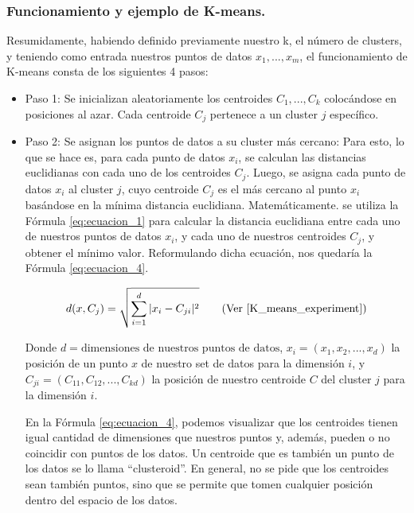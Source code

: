 \documentclass[12pt,a4paper]{article}
\begin{document}
\begin{sloppypar}
\subsubsection{Funcionamiento y ejemplo de K-means.}\label{K_means_funcionamiento}

Resumidamente, habiendo definido previamente nuestro k, el número de clusters, y teniendo como entrada nuestros puntos de datos $x_{1},...,x_{m}$, el funcionamiento de K-means consta de los siguientes 4 pasos\cite{K_means_review}:

\begin{itemize}
\item Paso 1: Se inicializan aleatoriamente los centroides $C_{1},...,C_{k}$ colocándose en posiciones al azar. Cada centroide $C_{j}$ pertenece a un cluster $j$ específico. 
\item Paso 2: Se asignan los puntos de datos a su cluster más cercano: Para esto, lo que se hace es, para cada punto de datos $x_{i}$, se calculan las distancias euclidianas con cada uno de los centroides $C_{j}$. Luego, se asigna cada punto de datos $x_{i}$ al cluster $j$, cuyo centroide $C_{j}$ es el más cercano al punto $x_{i}$ basándose en la mínima distancia euclidiana. Matemáticamente. se utiliza la Fórmula \ref{eq:ecuacion_1} para calcular la distancia euclidiana entre cada uno de nuestros puntos de datos $x_{i}$, y cada uno de nuestros centroides $C_{j}$, y obtener el mínimo valor. Reformulando dicha ecuación, nos quedaría la Fórmula \ref{eq:ecuacion_4}.   

\begin{equation}\label{eq:ecuacion_4}
d(x,C_{j})=\sqrt{\sum_{i=1}^{d}|x_{i}-C_{ji}|^2}  \qquad  \text{(Ver \cite{K_means_experiment})}
\end{equation}

Donde $d = \text{dimensiones de nuestros puntos de datos}$, $x_{i} = (x_{1},x_{2},...,x_{d})$ la posición de un punto $x$ de nuestro set de datos para la dimensión $i$, y $C_{ji} = (C_{11},C_{12},...,C_{kd})$ la posición de nuestro centroide $C$ del cluster $j$ para la dimensión $i$.
            
En la Fórmula \ref{eq:ecuacion_4}, podemos visualizar que los centroides tienen igual cantidad de dimensiones que nuestros puntos y, además, pueden o no coincidir con puntos de los datos. Un centroide que es también un punto de los datos se lo llama “clusteroid”. En general, no se pide que los centroides sean también puntos, sino que se permite que tomen cualquier posición dentro del espacio de los datos.


\end{itemize}
\end{sloppypar}
\end{document}
